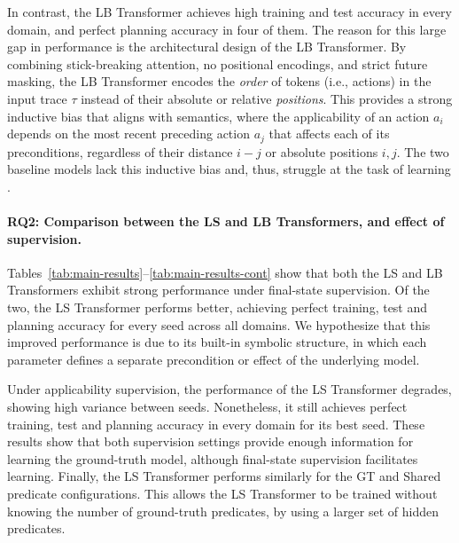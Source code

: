     In contrast, the LB Transformer achieves high training and test accuracy in every domain, and perfect planning accuracy in four of them.
    The reason for this large gap in performance is the architectural design of the LB Transformer. 
    By combining stick-breaking attention, no positional encodings, and strict future masking, the LB Transformer encodes the \textit{order} of tokens (i.e., actions) in the input trace $\tau$ instead of their absolute or relative \textit{positions}.
    This provides a strong inductive bias that aligns with \strips semantics, where the applicability of an action $a_i$ depends on the most recent preceding action $a_j$ that affects each of its preconditions, regardless of their distance $i-j$ or absolute positions $i,j$.
    The two baseline models lack this inductive bias and, thus, struggle at the task of learning \strips.
    
    \paragraph{RQ2: Comparison between the LS and LB Transformers, and effect of supervision.}
    Tables~\ref{tab:main-results}--\ref{tab:main-results-cont} show that both the LS and LB Transformers exhibit strong performance under final-state supervision. Of the two, the LS Transformer performs better, achieving perfect training, test and planning accuracy for every seed across all domains.
    We hypothesize that this improved performance is due to its built-in symbolic structure, in which each parameter defines a separate precondition or effect of the underlying \strips model.
    
    Under applicability supervision, the performance of the LS Transformer degrades, showing high variance between seeds. Nonetheless, it still achieves perfect training, test and planning accuracy in every domain for its best seed.
    These results show that both supervision settings provide enough information for learning the ground-truth \strips model, although final-state supervision facilitates learning.
    Finally, the LS Transformer performs similarly for the GT and Shared predicate configurations. This allows the LS Transformer to be trained without knowing the number of ground-truth predicates, by using a larger set of hidden predicates.
    
